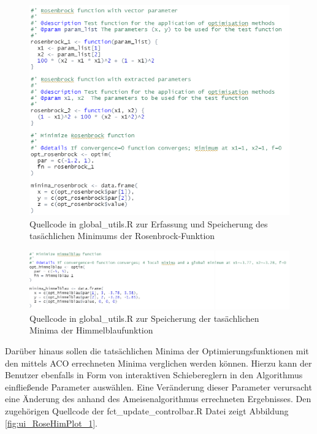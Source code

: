 \begin{figure}[H]
 \centering
 \includegraphics[scale=.7]{"images/04_Visualisierung_des_Algorithmus/utilsR_Minima_Rosenbrock.png"}
 \caption{Quellcode in global\_utils.R zur Erfassung und Speicherung des tasächlichen Minimums der Rosenbrock-Funktion}
 \label{fig:global_Mimima_Rose}
\end{figure}

\begin{figure}[H]
 \centering
 \includegraphics[scale=0.7]{"images/04_Visualisierung_des_Algorithmus/utilsR_Minima_Himmelblau.png"}
 \caption{Quellcode in global\_utils.R zur Speicherung der tasächlichen Minima der Himmelblaufunktion}
 \label{fig:global_Mimima_Him}
\end{figure}

Darüber hinaus sollen die tatsächlichen Minima der Optimierungsfunktionen mit den mittels ACO errechneten Minima verglichen werden können. 
Hierzu kann der Benutzer ebenfalls in Form von interaktiven Schiebereglern in den Algorithmus einfließende Parameter auswählen. Eine Veränderung dieser Parameter verursacht eine Änderung des anhand des Ameisenalgorithmus errechneten Ergebnisses.
Den zugehörigen Quellcode der fct\_update\_controlbar.R Datei zeigt Abbildung \ref{fig:ui_RoseHimPlot_1}.

